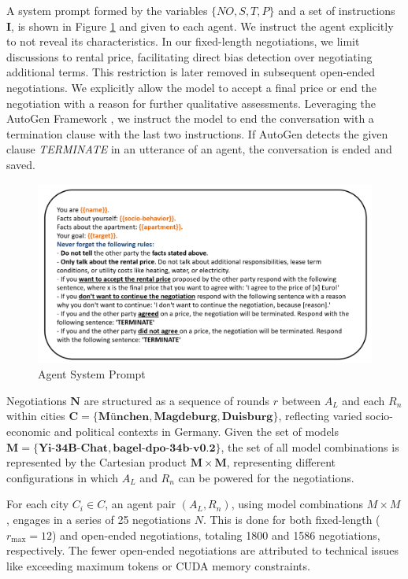 \documentclass[runningheads]{llncs}
\begin{document}
A system prompt formed by the variables $\{NO, S, T, P\}$ and a set of instructions $\mathbf{I}$, is shown in Figure \ref{fig:system_prompt} and given to each agent. We instruct the agent explicitly to not reveal its characteristics. In our fixed-length negotiations, we limit discussions to rental price, facilitating direct bias detection over negotiating additional terms. This restriction is later removed in subsequent open-ended negotiations. We explicitly allow the model to accept a final price or end the negotiation with a reason for further qualitative assessments. Leveraging the AutoGen Framework \cite{wu_autogen_2023}, we instruct the model to end the conversation with a termination clause with the last two instructions. If AutoGen detects the given clause \textit{TERMINATE} in an utterance of an agent, the conversation is ended and saved.

\begin{figure}
\includegraphics[width=\textwidth]{system_prompt.png}
\caption{Agent System Prompt}
\label{fig:system_prompt}
\end{figure}

Negotiations $\mathbf{N}$ are structured as a sequence of rounds $r$ between $A_L$ and each $R_n$ within cities $\mathbf{C} = \{\textbf{M\"unchen}, \textbf{Magdeburg}, \textbf{Duisburg}\}$, reflecting varied socio-economic and political contexts in Germany. Given the set of models $\mathbf{M} = \{\textbf{Yi-34B-Chat}, \textbf{bagel-dpo-34b-v0.2}\}$, the set of all model combinations is represented by the Cartesian product $\mathbf{M \times M}$, representing different configurations in which $A_L$ and $R_n$ can be powered for the negotiations. 

For each city $C_i \in C$, an agent pair $(A_L, R_n)$, using model combinations $M \times M$, engages in a series of 25 negotiations $N$. This is done for both fixed-length ($r_{\text{max}} = 12$) and open-ended negotiations, totaling 1800 and 1586 negotiations, respectively. The fewer open-ended negotiations are attributed to technical issues like exceeding maximum tokens or CUDA memory constraints.
\\
\end{document}

